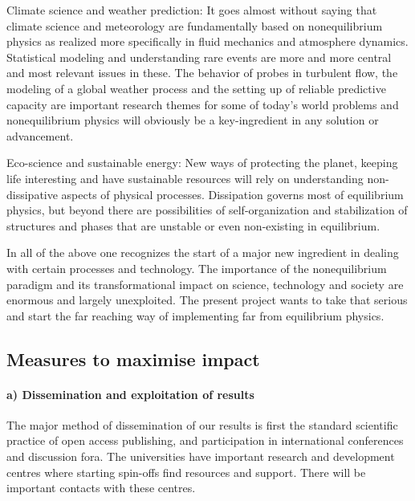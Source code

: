 \begin{compactenum}
\item Climate science and weather prediction: It goes almost without saying that climate science and meteorology are fundamentally based on nonequilibrium physics as realized more specifically in fluid mechanics and atmosphere dynamics. Statistical modeling and understanding rare events are more and more central and most relevant issues in these. The behavior of probes in turbulent flow, the modeling of a global weather process and the setting up of reliable predictive capacity  are important research themes for some of today's world problems and nonequilibrium physics will obviously be a key-ingredient in any solution or advancement. 
\item Eco-science and sustainable energy: New ways of protecting the planet, keeping life interesting and have sustainable resources will rely on understanding non-dissipative aspects of physical processes.  Dissipation governs most of equilibrium physics, but beyond there are possibilities of self-organization and stabilization of structures and phases that are unstable or even non-existing in equilibrium.
\end{compactenum}

In all of the above one recognizes the start of a major new ingredient in
dealing with certain processes and technology. The importance of the
nonequilibrium paradigm and its transformational impact on science, technology
and society are enormous and largely unexploited. The present project wants to
take that serious and start the far reaching way of implementing far from
equilibrium physics.


\subsection{Measures to maximise impact}

\paragraph{a) Dissemination and exploitation of results}

The major method of dissemination of our results is first the standard scientific practice of open access publishing, and participation in international conferences and discussion fora.  
The universities have important research and development centres where starting spin-offs find resources and support.
There will be important contacts with these centres.  


